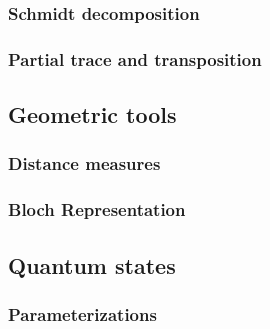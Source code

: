 \documentclass[11pt,a4paper]{article}
\begin{document}
\subsubsection{Schmidt decomposition}

\subsubsection{Partial trace and transposition}

\subsection{Geometric tools}

\subsubsection{Distance measures}

\subsubsection{Bloch Representation}

\subsection{Quantum states}

\subsubsection{Parameterizations}
\end{document}
